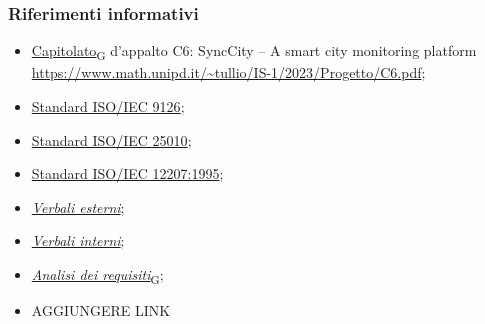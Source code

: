 \subsubsection{Riferimenti informativi}
\begin{itemize}
    \item \href{https://7last.github.io/docs/rtb/documentazione-interna/glossario#capitolato}{Capitolato\textsubscript{G}} d'appalto C6: SyncCity – A smart city monitoring platform\\
    \url{https://www.math.unipd.it/~tullio/IS-1/2023/Progetto/C6.pdf};
    \item \href{https://it.wikipedia.org/wiki/ISO/IEC_9126}{Standard ISO/IEC 9126};
    \item \href{https://iso25000.com/index.php/en/iso-25000-standards/iso-25010}{Standard ISO/IEC 25010};
    \item \href{ https://en.wikipedia.org/wiki/ISO/IEC_12207}{Standard ISO/IEC 12207:1995};
    \item \href{URL}{\textit{Verbali esterni}};
    \item \href{URL}{\textit{Verbali interni}};
    \item \href{URL}{\href{https://7last.github.io/docs/rtb/documentazione-interna/glossario#analisi-dei-requisiti}{\textit{Analisi dei requisiti}\textsubscript{G}}};
    \item AGGIUNGERE LINK
\end{itemize}